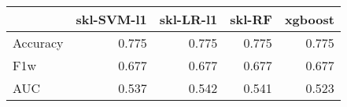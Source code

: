 \begin{tabular}{lrrrr}
\toprule
{} &  skl-SVM-l1 &  skl-LR-l1 &  skl-RF &  xgboost \\
\midrule
Accuracy &       0.775 &      0.775 &   0.775 &    0.775 \\
F1w      &       0.677 &      0.677 &   0.677 &    0.677 \\
AUC      &       0.537 &      0.542 &   0.541 &    0.523 \\
\bottomrule
\end{tabular}
